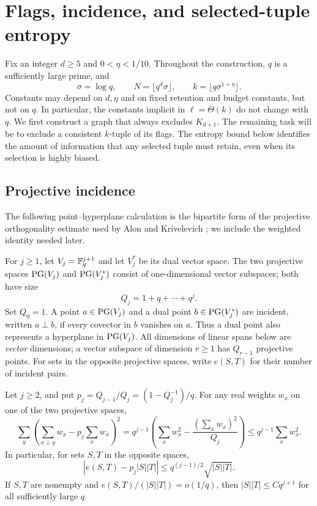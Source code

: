 \section{Flags, incidence, and selected-tuple entropy}
\label{base:section}

Fix an integer $d\ge5$ and $0<\eta<1/10$. Throughout the construction,
$q$ is a sufficiently large prime, and
\begin{equation}
 \sigma=\log q,\qquad N=\lfloor q^d\sigma\rfloor,
 \qquad k=\lfloor q\sigma^{1+\eta}\rfloor.
 \label{base:stream-parameters}
\end{equation}
Constants may depend on $d,\eta$ and on fixed retention and budget
constants, but not on $q$. In particular, the constants implicit in
$\ell=\Theta(k)$ do not change with $q$.
We first construct a graph that always excludes $K_{d+1}$. The remaining
task will be to exclude a consistent $k$-tuple of its flags. The entropy
bound below identifies the amount of information that any selected tuple
must retain, even when its selection is highly biased.

\subsection{Projective incidence}

The following point--hyperplane calculation is the bipartite form of the
projective orthogonality estimate used by Alon and Krivelevich
\cite{AlonKrivelevich1997}; we include the weighted identity needed later.

For $j\ge1$, let $V_j=\mathbb F_q^{j+1}$ and let $V_j^*$ be its dual vector
space. The two projective spaces $\operatorname{PG}(V_j)$ and $\operatorname{PG}(V_j^*)$ consist of
one-dimensional vector subspaces; both have size
\[
 Q_j=1+q+\cdots+q^j.
\]
Set $Q_0=1$. A point $a\in\operatorname{PG}(V_j)$ and a dual point
$b\in\operatorname{PG}(V_j^*)$ are incident, written $a\perp b$, if every covector
in $b$ vanishes on $a$. Thus a dual point also represents a hyperplane
in $\operatorname{PG}(V_j)$. All dimensions of linear spans below are \emph{vector}
dimensions; a vector subspace of dimension $r\ge1$ has $Q_{r-1}$
projective points. For sets in the opposite projective spaces, write
$e(S,T)$ for their number of incident pairs.

\begin{lemma}
\label{base:incidence}
Let $j\ge2$, and put $p_j=Q_{j-1}/Q_j=(1-Q_j^{-1})/q$.
For any real weights $w_x$ on one of the two projective spaces,
\begin{equation}
 \sum_y\left(\sum_{x\perp y}w_x-p_j\sum_xw_x\right)^2
 =q^{j-1}\left(\sum_xw_x^2-\frac{(\sum_xw_x)^2}{Q_j}\right)
 \le q^{j-1}\sum_xw_x^2.
 \label{base:weighted-variance}
\end{equation}
In particular, for sets $S,T$ in the opposite spaces,
\begin{equation}
 \left|e(S,T)-p_j|S||T|\right|
 \le q^{(j-1)/2}\sqrt{|S||T|}.
 \label{base:mixing}
\end{equation}
If $S,T$ are nonempty and $e(S,T)/(|S||T|)=o(1/q)$, then
$|S||T|\le Cq^{j+1}$ for all sufficiently large $q$.
\end{lemma}

